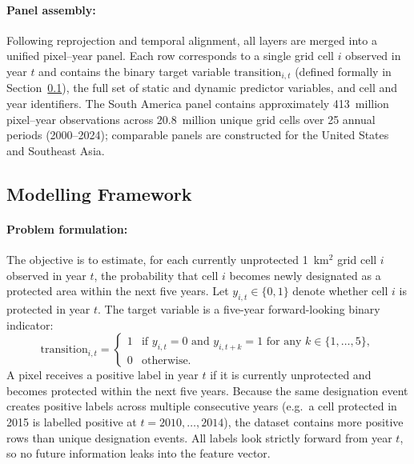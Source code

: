 \documentclass[12pt]{article}
\theoremstyle{break}
\begin{document}
\paragraph{Panel assembly:}
Following reprojection and temporal alignment, all layers are merged into a unified
pixel--year panel. Each row corresponds to a single grid cell $i$ observed in year $t$
and contains the binary target variable $\text{transition}_{i,t}$ (defined formally
in Section~\ref{sec:framework}), the full set of static and dynamic predictor
variables, and cell and year identifiers. The South America panel contains
approximately 413~million pixel--year observations across 20.8~million unique grid
cells over 25 annual periods (2000--2024); comparable panels are constructed for the
United States and Southeast Asia.

\subsection{Modelling Framework}
\label{sec:framework}

\paragraph{Problem formulation:}
The objective is to estimate, for each currently unprotected 1~km$^2$ grid cell $i$
observed in year $t$, the probability that cell $i$ becomes newly designated as a
protected area within the next five years. Let $y_{i,t} \in \{0,1\}$ denote
whether cell $i$ is protected in year $t$. The target variable is a five-year forward-looking binary indicator:
\begin{equation}
  \text{transition}_{i,t} =
  \begin{cases}
    1 & \text{if } y_{i,t} = 0 \text{ and } y_{i,t+k} = 1
        \text{ for any } k \in \{1,\dots,5\}, \\
    0 & \text{otherwise.}
  \end{cases}
  \label{eq:target}
\end{equation}
A pixel receives a positive label in year $t$ if it is currently unprotected and
becomes protected within the next five years. Because the same designation event
creates positive labels across multiple consecutive years (e.g.\ a cell protected in
2015 is labelled positive at $t = 2010, \ldots, 2014$), the dataset contains more
positive rows than unique designation events. All labels look strictly forward from
year $t$, so no future information leaks into the feature vector.
\end{document}
